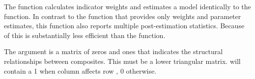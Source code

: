 \documentclass[a4paper]{book}
\begin{document}
%
\begin{Details}\relax
The function  calculates indicator weights and estimates a model
identically to the   function. In contrast to the  function
that provides only weights and parameter estimates, this function also reports multiple post-estimation
statistics. Because of this  is substantially less efficient than the 
function.

The argument  is a matrix of zeros and ones that indicates
the structural relationships between composites. This must be a lower
triangular matrix.  will contain a 1 when column 
affects row , 0 otherwise. \\{}
\end{Details}
%
\end{document}
